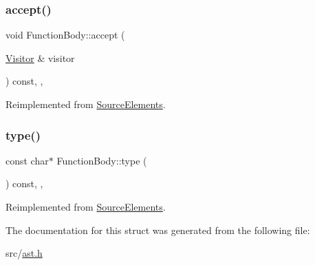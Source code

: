\subsubsection{\texorpdfstring{accept()}{accept()}}
{\footnotesize\ttfamily void Function\+Body\+::accept (\begin{DoxyParamCaption}\item[{\hyperlink{struct_visitor}{Visitor} \&}]{visitor }\end{DoxyParamCaption}) const\hspace{0.3cm}{\ttfamily [inline]}, {\ttfamily [override]}, {\ttfamily [virtual]}}



Reimplemented from \hyperlink{struct_source_elements_af5c2f1b3c9a9961f4d76734953a4fdf5}{Source\+Elements}.

\mbox{\label{struct_function_body_a8f56476c603667a3a3240de9c2ee02bc}} 
\subsubsection{\texorpdfstring{type()}{type()}}
{\footnotesize\ttfamily const char$\ast$ Function\+Body\+::type (\begin{DoxyParamCaption}{ }\end{DoxyParamCaption}) const\hspace{0.3cm}{\ttfamily [inline]}, {\ttfamily [override]}, {\ttfamily [virtual]}}



Reimplemented from \hyperlink{struct_source_elements_a2e6131a995ee5d7e0c8e7a440827245d}{Source\+Elements}.



The documentation for this struct was generated from the following file\+:\begin{DoxyCompactItemize}
\item 
src/\hyperlink{ast_8h}{ast.\+h}\end{DoxyCompactItemize}
